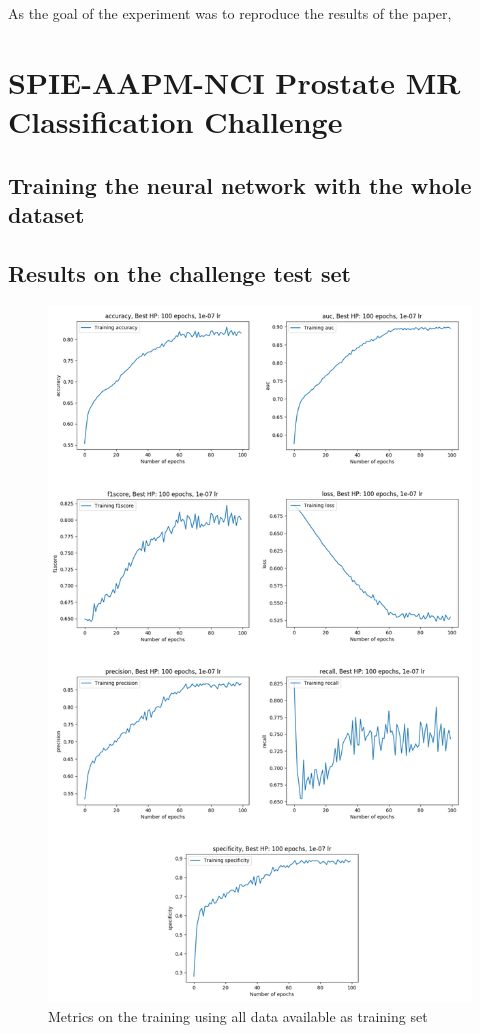 As the goal of the experiment was to reproduce the results of the paper, 

\section{SPIE-AAPM-NCI Prostate MR Classification Challenge}
\label{sec:classification_challenge}
\subsection{Training the neural network with the whole dataset}
\subsection{Results on the challenge test set}


\begin{figure}[!h]
\centering
\includegraphics[width=1\textwidth, keepaspectratio=true]{./figures/paper_reproduction_results_challenge_full_dataset.png}
\caption{Metrics on the training using all data available as training set}
\label{fig:challenge_all_results}
\end{figure}


